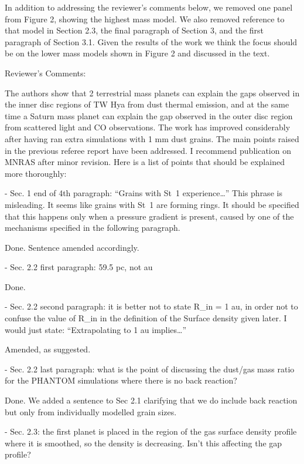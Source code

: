 \documentclass{article}
\begin{document}
{\color{blue}
In addition to addressing the reviewer's comments below, we removed one panel
from Figure 2, showing the highest mass model. We also removed reference to that
model in Section 2.3, the final paragraph of Section 3, and the first paragraph
of Section 3.1. Given the results of the work we think the focus should be on
the lower mass models shown in Figure 2 and discussed in the text.
}

Reviewer's Comments:

The authors show that 2 terrestrial mass planets can explain the gaps observed
in the inner disc regions of TW Hya from dust thermal emission, and at the same
time a Saturn mass planet can explain the gap observed in the outer disc region
from scattered light and CO observations.  The work has improved considerably
after having ran extra simulations with 1 mm dust grains. The main points raised
in the previous referee report have been addressed.  I recommend publication on
MNRAS after minor revision.  Here is a list of points that should be explained
more thoroughly:

- Sec. 1 end of 4th paragraph: ``Grains with St~1 experience\ldots'' This phrase is
misleading. It seems like grains with St~1 are forming rings. It should be
specified that this happens only when a pressure gradient is present, caused by
one of the mechanisms specified in the following paragraph.

{\color{blue}
Done. Sentence amended accordingly.
}

- Sec. 2.2 first paragraph: 59.5 pc, not au

{\color{blue}
Done.
}

- Sec. 2.2 second paragraph: it is better not to state R\_in = 1 au, in order
not to confuse the value of R\_in in the definition of the Surface density given
later. I would just state: ``Extrapolating to 1 au implies…”

{\color{blue}
Amended, as suggested.
}

- Sec. 2.2 last paragraph: what is the point of discussing the dust/gas mass
ratio for the PHANTOM simulations where there is no back reaction?

{\color{blue}
Done. We added a sentence to Sec 2.1 clarifying that we do include back reaction
but only from individually modelled grain sizes.
}

- Sec. 2.3: the first planet is placed in the region of the gas surface density
profile where it is smoothed, so the density is decreasing. Isn't this affecting
the gap profile?
\end{document}
